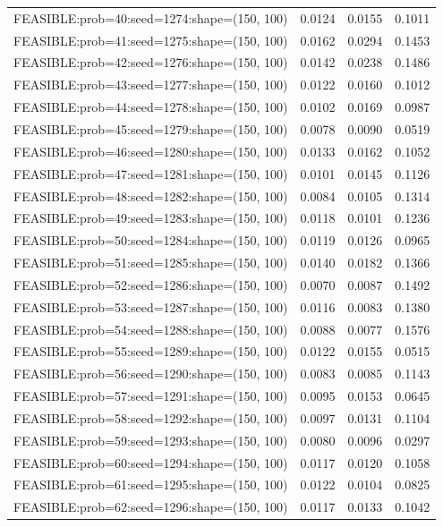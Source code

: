 \begin{longtable}{lccc}
FEASIBLE:prob=40:seed=1274:shape=(150, 100)  & 0.0124 & 0.0155 & 0.1011 \\
FEASIBLE:prob=41:seed=1275:shape=(150, 100)  & 0.0162 & 0.0294 & 0.1453 \\
FEASIBLE:prob=42:seed=1276:shape=(150, 100)  & 0.0142 & 0.0238 & 0.1486 \\
FEASIBLE:prob=43:seed=1277:shape=(150, 100)  & 0.0122 & 0.0160 & 0.1012 \\
FEASIBLE:prob=44:seed=1278:shape=(150, 100)  & 0.0102 & 0.0169 & 0.0987 \\
FEASIBLE:prob=45:seed=1279:shape=(150, 100)  & 0.0078 & 0.0090 & 0.0519 \\
FEASIBLE:prob=46:seed=1280:shape=(150, 100)  & 0.0133 & 0.0162 & 0.1052 \\
FEASIBLE:prob=47:seed=1281:shape=(150, 100)  & 0.0101 & 0.0145 & 0.1126 \\
FEASIBLE:prob=48:seed=1282:shape=(150, 100)  & 0.0084 & 0.0105 & 0.1314 \\
FEASIBLE:prob=49:seed=1283:shape=(150, 100)  & 0.0118 & 0.0101 & 0.1236 \\
FEASIBLE:prob=50:seed=1284:shape=(150, 100)  & 0.0119 & 0.0126 & 0.0965 \\
FEASIBLE:prob=51:seed=1285:shape=(150, 100)  & 0.0140 & 0.0182 & 0.1366 \\
FEASIBLE:prob=52:seed=1286:shape=(150, 100)  & 0.0070 & 0.0087 & 0.1492 \\
FEASIBLE:prob=53:seed=1287:shape=(150, 100)  & 0.0116 & 0.0083 & 0.1380 \\
FEASIBLE:prob=54:seed=1288:shape=(150, 100)  & 0.0088 & 0.0077 & 0.1576 \\
FEASIBLE:prob=55:seed=1289:shape=(150, 100)  & 0.0122 & 0.0155 & 0.0515 \\
FEASIBLE:prob=56:seed=1290:shape=(150, 100)  & 0.0083 & 0.0085 & 0.1143 \\
FEASIBLE:prob=57:seed=1291:shape=(150, 100)  & 0.0095 & 0.0153 & 0.0645 \\
FEASIBLE:prob=58:seed=1292:shape=(150, 100)  & 0.0097 & 0.0131 & 0.1104 \\
FEASIBLE:prob=59:seed=1293:shape=(150, 100)  & 0.0080 & 0.0096 & 0.0297 \\
FEASIBLE:prob=60:seed=1294:shape=(150, 100)  & 0.0117 & 0.0120 & 0.1058 \\
FEASIBLE:prob=61:seed=1295:shape=(150, 100)  & 0.0122 & 0.0104 & 0.0825 \\
FEASIBLE:prob=62:seed=1296:shape=(150, 100)  & 0.0117 & 0.0133 & 0.1042 \\

\end{longtable}
